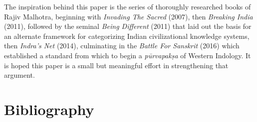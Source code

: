 The inspiration behind this paper is the series of thoroughly researched books of Rajiv Malhotra, beginning with \textit{Invading The Sacred} (2007), then \textit{Breaking India} (2011), followed by the seminal \textit{Being Different} (2011) that laid out the basis for an alternate framework for categorizing Indian civilizational knowledge systems, then \textit{Indra’s Net} (2014), culminating in the \textit{Battle For Sanskrit} (2016) which established a standard from which to begin a \textit{pūrvapakṣa} of Western Indology. It is hoped this paper is a small but meaningful effort in strengthening that argument.


\section*{Bibliography}

